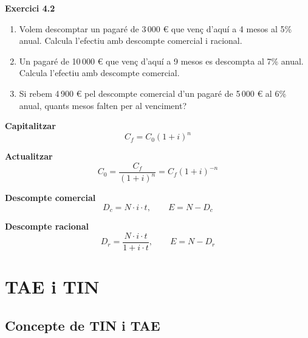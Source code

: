 \documentclass[12pt]{article}
\begin{document}
\begin{exercici}
\textbf{Exercici 4.2}\\
\begin{enumerate}[label=\alph*)]
    \item Volem descomptar un pagaré de 3\,000 € que venç d'aquí a 4 mesos al 5\% anual. Calcula l'efectiu amb descompte comercial i racional.
    \item Un pagaré de 10\,000 € que venç d'aquí a 9 mesos es descompta al 7\% anual. Calcula l'efectiu amb descompte comercial.
    \item Si rebem 4\,900 € pel descompte comercial d'un pagaré de 5\,000 € al 6\% anual, quants mesos falten per al venciment?
\end{enumerate}
\end{exercici}

\begin{resum}[title=Resum 4: Capitalització i Actualització]
\textbf{Capitalitzar}
\[
C_f = C_0(1+i)^n
\]

\textbf{Actualitzar}
\[
C_0 = \dfrac{C_f}{(1+i)^n} = C_f(1+i)^{-n}
\]

\textbf{Descompte comercial}
\[
D_c = N \cdot i \cdot t, \qquad E = N - D_c
\]

\textbf{Descompte racional}
\[
D_r = \dfrac{N \cdot i \cdot t}{1 + i \cdot t}, \qquad E = N - D_r
\]
\end{resum}

\newpage

\section{TAE i TIN}

\subsection{Concepte de TIN i TAE}
\end{document}
